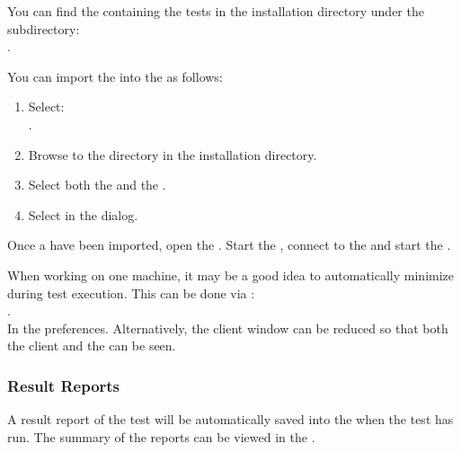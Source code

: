 You can find the \gdproject{} containing the tests
in the \app{} installation directory under the subdirectory:\\
. 

You can import the \gdproject{} into the \ite{} as follows:
\begin{enumerate}
\item Select:\\ .
\item Browse to the  directory in the \app{} installation directory. 
\item Select both the  \gdproject{} and the  \gdproject{}. 
\item  Select  in the  dialog. 
\end{enumerate}


Once a \gdprojects have been imported, open the  \gdproject{}. Start the \gdagent {}, connect to the \gdagent {} and start the \gdaut{} . 


When working on one machine, it may be a good idea to automatically minimize 
\app{}during test execution. This can be done via :\\
. \\
In the  preferences. 
Alternatively, the client window can be reduced so 
that both the client and the \gdaut{} can be seen. 

\subsubsection{Result Reports}

A result report of the test will be automatically saved into the \gddb{} when the test has run. The summary of the reports can be viewed in the \gdtestsummaryview{} .
